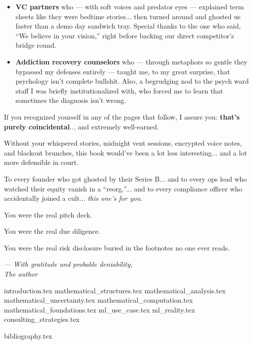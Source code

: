 \documentclass{article}
\begin{document}
\begin{itemize}
    \item \textbf{VC partners} who --- with soft voices and predator eyes --- explained term sheets 
    like they were bedtime stories...  
    then turned around and ghosted us faster than a demo day sandwich tray.  
    Special thanks to the one who said, ``We believe in your vision,''
    right before backing our direct competitor's bridge round.

    \item \textbf{Addiction recovery counselors} who --- through metaphors so gentle they bypassed my 
    defenses entirely --- taught me, to my great surprise, that psychology isn’t complete bullshit.  
    Also, a begrudging nod to the psych ward staff I was briefly institutionalized with,  
    who forced me to learn that sometimes the diagnosis isn’t wrong.
  \end{itemize}
  
  If you recognized yourself in any of the pages that follow, I assure you:  
  \textbf{that’s purely coincidental}... and extremely well-earned.

  Without your whispered stories, midnight vent sessions, encrypted voice notes, and blackout brunches,  
  this book would’ve been a lot less interesting... and a lot more defensible in court.

  To every founder who got ghosted by their Series B... 
  and to every ops lead who watched their equity vanish in a “reorg,”... 
  and to every compliance officer who accidentally joined a cult... 
  \textit{this one’s for you.}

  You were the real pitch deck.  

  You were the real due diligence.  

  You were the real risk disclosure buried in the footnotes no one ever reads.

  \begin{flushright}
  \textit{— With gratitude and probable deniability,}\\
  \textit{The author}
  \end{flushright}

  
  
  


  \tableofcontents

  \newpage


  {introduction.tex}
  {mathematical_structures.tex}
  {mathematical_analysis.tex}
  {mathematical_uncertainty.tex}
  {mathematical_computation.tex}
  {mathematical_foundations.tex}
  {ml_use_case.tex}
  {ml_reality.tex}
  {consulting_strategies.tex}

  {bibliography.tex}
\end{document}
